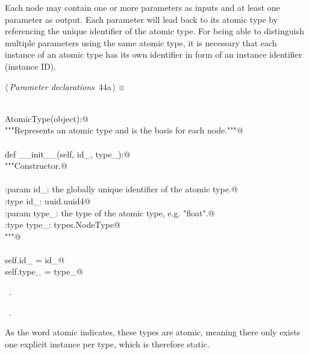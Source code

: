\documentclass[
    a4paper,      %
    10pt,         %
    openright,    %
    notitlepage,  %
    parskip=half, %
]{scrreprt}       %
\theoremstyle{definition}                    %
\begin{document}
Each node may contain one or more parameters as inputs and at least one
parameter as output. Each parameter will lead back to its atomic type by
referencing the unique identifier of the atomic type. For being able to
distinguish multiple parameters using the same atomic type, it is necessary that
each instance of an atomic type has its own identifier in form of an instance
identifier (instance ID).

\begin{flushleft} \small
\begin{minipage}{\linewidth}\label{scrap55}\raggedright\small
{} $\langle\,${\itshape Parameter declarations}\nobreak\ {\footnotesize {44a}}$\,\rangle\equiv$
\vspace{-1ex}
\begin{list}{}{} \item
\mbox{}\lstinline@@\\
\mbox{}\lstinline@class AtomicType(object):@\\
\mbox{}\lstinline@    """Represents an atomic type and is the basis for each node."""@\\
\mbox{}\lstinline@@\\
\mbox{}\lstinline@    def __init__(self, id_, type_):@\\
\mbox{}\lstinline@        """Constructor.@\\
\mbox{}\lstinline@@\\
\mbox{}\lstinline@        :param id_: the globally unique identifier of the atomic type.@\\
\mbox{}\lstinline@        :type  id_: uuid.uuid4@\\
\mbox{}\lstinline@        :param type_: the type of the atomic type, e.g. "float".@\\
\mbox{}\lstinline@        :type  type_: types.NodeType@\\
\mbox{}\lstinline@        """@\\
\mbox{}\lstinline@@\\
\mbox{}\lstinline@        self.id_   = id_@\\
\mbox{}\lstinline@        self.type_ = type_@\\
\mbox{}\lstinline@@{\NWsep}
\end{list}
\vspace{-1.5ex}
\footnotesize
\begin{list}{}{\setlength{\itemsep}{-\parsep}\setlength{\itemindent}{-\leftmargin}}
\item \NWtxtMacroDefBy\ .
\item \NWtxtMacroRefIn\ .

\item{}
\end{list}
\end{minipage}\vspace{4ex}
\end{flushleft}
As the word atomic indicates, these types are atomic, meaning there only exists
one explicit instance per type, which is therefore static.
\end{document}
